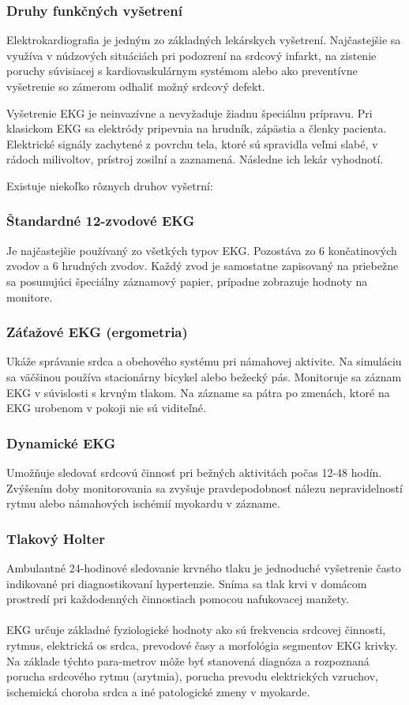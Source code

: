 \documentclass[titlepage,12pt]{article}
\begin{document}
\subsubsection{Druhy funkčných vyšetrení}
Elektrokardiografia je jedným zo základných lekárskych vyšetrení. Najčastejšie sa využíva \linebreak v núdzových situáciách pri podozrení na srdcový infarkt, na zistenie poruchy súvisiacej s kardiovaskulárnym systémom alebo ako preventívne vyšetrenie so zámerom odhaliť možný srdcový defekt.

Vyšetrenie EKG je neinvazívne a nevyžaduje žiadnu špeciálnu prípravu. Pri klasickom EKG sa elektródy pripevnia na hrudník, zápästia a členky pacienta. Elektrické signály zachytené \linebreak z povrchu tela, ktoré sú spravidla veľmi slabé, v rádoch milivoltov, prístroj zosilní a zaznamená. Následne ich lekár vyhodnotí.

Existuje niekoľko rôznych druhov vyšetrní:
\subsubsection*{Štandardné 12-zvodové EKG}
Je najčastejšie používaný zo všetkých typov EKG. Pozostáva zo 6 končatinových zvodov a 6 hrudných zvodov. Každý zvod je samostatne zapisovaný na priebežne sa posunujúci špeciálny záznamový papier, prípadne zobrazuje hodnoty na monitore.
\subsubsection*{Záťažové EKG (ergometria)}
Ukáže správanie srdca a obehového systému pri námahovej aktivite. Na simuláciu sa väčšinou používa stacionárny bicykel alebo bežecký pás. Monitoruje sa záznam EKG v súvislosti \linebreak s krvným tlakom. Na zázname sa pátra po zmenách, ktoré na EKG urobenom v pokoji nie sú viditeľné.
\subsubsection*{Dynamické EKG}
Umožňuje sledovať srdcovú činnosť pri bežných aktivitách počas 12-48 hodín. Zvýšením doby monitorovania sa zvyšuje pravdepodobnosť nálezu nepravidelností rytmu alebo námahových ischémií myokardu v zázname.
\subsubsection*{Tlakový Holter}
Ambulantné 24-hodinové sledovanie krvného tlaku je jednoduché vyšetrenie často indikované pri diagnostikovaní hypertenzie. Sníma sa tlak krvi v domácom prostredí pri každodenných činnostiach pomocou nafukovacej manžety.
\\
\\
EKG určuje základné fyziologické hodnoty ako sú frekvencia srdcovej činnosti, rytmus, elektrická os srdca, prevodové časy a morfológia segmentov EKG krivky. Na základe týchto para-metrov môže byť stanovená diagnóza a rozpoznaná porucha srdcového rytmu (arytmia), porucha prevodu elektrických vzruchov, ischemická choroba srdca a iné patologické zmeny v myokarde.
\end{document}
